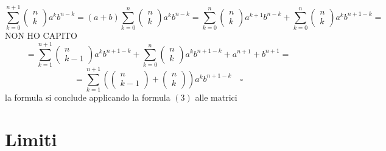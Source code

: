 \documentclass{article}
\begin{document}
\begin{flushleft}
    \begin{equation}
        \sum_{k=0}^{n+1}
        \begin{pmatrix}
            n\\
            k
        \end{pmatrix}a^kb^{n-k}=(a+b)
        \sum_{k=0}^{n}
        \begin{pmatrix}
            n\\
            k
        \end{pmatrix}a^kb^{n-k}=
        \sum_{k=0}^{n}
        \begin{pmatrix}
            n\\
            k
        \end{pmatrix}a^{k+1}b^{n-k}+
        \sum_{k=0}^{n}
        \begin{pmatrix}
            n\\
            k
        \end{pmatrix}a^{k}b^{n+1-k}=
    \end{equation}
    NON HO CAPITO
    \begin{equation}
       = \sum_{k=1}^{n+1}
        \begin{pmatrix}
            n\\
            k-1
        \end{pmatrix}a^{k}b^{n+1-k}+
        \sum_{k=0}^{n}
        \begin{pmatrix}
            n\\
            k
        \end{pmatrix}a^{k}b^{n+1-k}+a^{n+1}+b^{n+1}=
    \end{equation}
    \begin{equation}
       = \sum_{k=1}^{n+1}(
        \begin{pmatrix}
            n\\
            k-1
        \end{pmatrix}+
        \begin{pmatrix}
            n\\
            k
        \end{pmatrix})
        a^{k}b^{n+1-k}\quad \square
    \end{equation}
    la formula si conclude applicando la formula $(3)$ alle matrici
   \end{flushleft}
   \section{Limiti}
\end{document}
